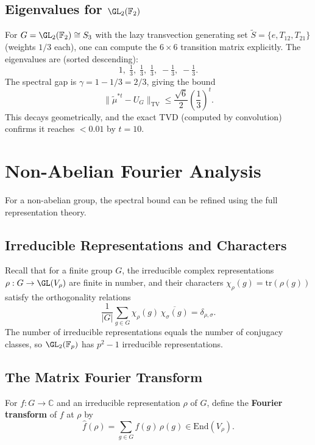\subsection{Eigenvalues for $\GL_2(\mathbb{F}_2)$}

For $G = \GL_2(\mathbb{F}_2) \cong S_3$ with the lazy transvection generating
set $\tilde{S} = \{e, T_{12}, T_{21}\}$ (weights $1/3$ each), one can compute
the $6 \times 6$ transition matrix explicitly.
The eigenvalues are (sorted descending):
\[
  1,\; \tfrac{1}{3},\; \tfrac{1}{3},\; \tfrac{1}{3},\; -\tfrac{1}{3},\; -\tfrac{1}{3}.
\]
The spectral gap is $\gamma = 1 - 1/3 = 2/3$, giving the bound
\[
  \|\tilde\mu^{*t} - U_G\|_{\mathrm{TV}} \leq \frac{\sqrt{6}}{2}\left(\frac{1}{3}\right)^t.
\]
This decays geometrically, and the exact TVD (computed by convolution) confirms
it reaches $< 0.01$ by $t = 10$.

\section{Non-Abelian Fourier Analysis}

For a non-abelian group, the spectral bound can be refined using the full
representation theory.

\subsection{Irreducible Representations and Characters}

Recall that for a finite group $G$, the irreducible complex representations
$\rho : G \to \GL(V_\rho)$ are finite in number, and their characters
$\chi_\rho(g) = \mathrm{tr}(\rho(g))$ satisfy the orthogonality relations
\[
  \frac{1}{|G|} \sum_{g \in G} \chi_\rho(g)\,\overline{\chi_\sigma(g)} = \delta_{\rho,\sigma}.
\]
The number of irreducible representations equals the number of conjugacy
classes, so $\GL_2(\mathbb{F}_p)$ has $p^2 - 1$ irreducible representations.

\subsection{The Matrix Fourier Transform}

\begin{definition}
For $f : G \to \mathbb{C}$ and an irreducible representation $\rho$ of $G$,
define the \textbf{Fourier transform} of $f$ at $\rho$ by
\[
  \hat{f}(\rho) = \sum_{g \in G} f(g)\,\rho(g) \in \mathrm{End}(V_\rho).
\]
\end{definition}

